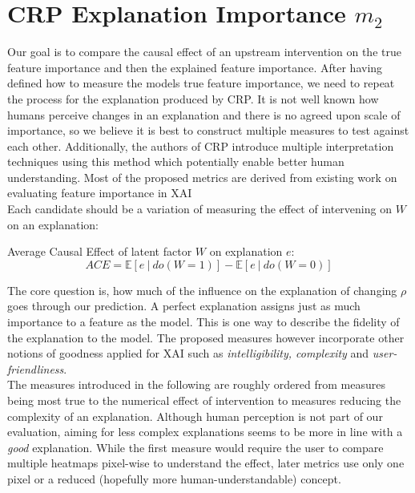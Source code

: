 \section{CRP Explanation Importance $m_2$}\label{section:measure}
Our goal is to compare the causal effect of an upstream intervention on the true feature importance and then the explained feature importance. After having defined how to measure the models true feature importance, we need to repeat the process for the explanation produced by CRP. It is not well known how humans perceive changes in an explanation and there is no agreed upon scale of importance, so we believe it is best to construct multiple measures to test against each other. {\color{gray} Additionally, the authors of CRP introduce multiple interpretation techniques using this method which potentially enable better human understanding. }Most of the proposed metrics are derived from existing work on evaluating feature importance in XAI \cite{Arras2022} \\

Each candidate should be a variation of measuring the effect of intervening on $W$ on an explanation:
\begin{center}
Average Causal Effect of latent factor $W$ on explanation $e$: \\
\begin{equation}
\displaystyle ACE = \mathbb{E} [e \ | \ do(W=1) ] - \mathbb{E} [ e \ | \ do(W=0) ]
\end{equation}
\end{center}
The core question is, how much of the influence on the explanation of changing $\rho$ goes through our prediction. A perfect explanation assigns just as much importance to a feature as the model. This is one way to describe the fidelity of the explanation to the model. The proposed measures however incorporate other notions of goodness applied for XAI such as \textit{intelligibility, complexity} and \textit{user-friendliness}. \\

The measures introduced in the following are roughly ordered from measures being most true to the numerical effect of intervention to measures reducing the complexity of an explanation. Although human perception is not part of our evaluation, aiming for less complex explanations seems to be more in line with a \textit{good} explanation. While the first measure would require the user to compare multiple heatmaps pixel-wise to understand the effect, later metrics use only one pixel or a reduced (hopefully more human-understandable) concept. 

